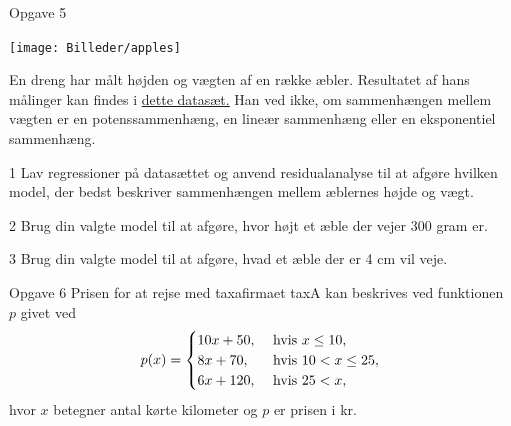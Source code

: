 \documentclass[12pt,x11names,a4paper]{article}
\begin{document}
\begin{opgavetekst}{Opgave 5}
	\begin{center}
		\texttt{[image: Billeder/apples]}
	\end{center}	
	En dreng har målt højden og vægten af en række æbler. Resultatet af hans målinger kan 
	findes i \href{https://github.com/ChristianJLex/TeachingNotes/raw/master/2023-2024/Data og lign/aeble.xlsx}{\color{blue!60} dette datasæt.} Han ved ikke, om sammenhængen mellem vægten er en potenssammenhæng, en lineær sammenhæng eller en eksponentiel sammenhæng.
\end{opgavetekst}
\begin{delopgave}{}{1}
	Lav regressioner på datasættet og anvend residualanalyse til at afgøre hvilken model, der 
	bedst beskriver sammenhængen mellem æblernes højde og vægt.
\end{delopgave}	
\begin{delopgave}{}{2}
	Brug din valgte model til at afgøre, hvor højt et æble der vejer 300 gram er.
\end{delopgave}
\begin{delopgave}{}{3}
	Brug din valgte model til at afgøre, hvad et æble der er 4 cm vil veje.
\end{delopgave}
\begin{opgavetekst}{Opgave 6}
	Prisen for at rejse med taxafirmaet taxA kan beskrives ved funktionen $p$ givet ved
	\begin{align*}
		p(x) = \begin{cases}
			10x + 50, &\textnormal{ hvis } x \leq 10, \\
			8x + 70,  &\textnormal{ hvis } 10 < x \leq 25, \\
			6x + 120, &\textnormal{ hvis } 25 < x,
		\end{cases}
	\end{align*}
hvor $x$ betegner antal kørte kilometer og $p$ er prisen i kr.
\end{opgavetekst}
\end{document}
